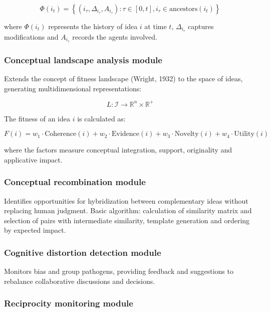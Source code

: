 \begin{equation}
	\Phi(i_t) = \left\{ (i_{\tau}, \Delta_{i_{\tau}}, A_{i_{\tau}}) :
	\tau \in [0,t], i_{\tau} \in \text{ancestors}(i_t) \right\}
\end{equation}


where $\Phi(i_t)$ represents the history of idea $i$ at time $t$, $\Delta_{i_{\tau}}$ captures modifications and $A_{i_{\tau}}$ records the agents involved.

\subsubsection{Conceptual landscape analysis module}

Extends the concept of fitness landscape (Wright, 1932) to the space of ideas, generating multidimensional representations:

\begin{equation}
	L: \mathcal{I} \rightarrow \mathbb{R}^n \times \mathbb{R}^+
\end{equation}

The fitness of an idea $i$ is calculated as:

\begin{equation}
	F(i) = w_1 \cdot \text{Coherence}(i) + w_2 \cdot \text{Evidence}(i) + w_3 \cdot \text{Novelty}(i) + w_4 \cdot \text{Utility}(i)
\end{equation}

where the factors measure conceptual integration, support, originality and applicative impact.

\subsubsection{Conceptual recombination module}

Identifies opportunities for hybridization between complementary ideas without replacing human judgment. Basic algorithm: calculation of similarity matrix and selection of pairs with intermediate similarity, template generation and ordering by expected impact.

\subsubsection{Cognitive distortion detection module}

Monitors bias and group pathogens, providing feedback and suggestions to rebalance collaborative discussions and decisions.

\subsubsection{Reciprocity monitoring module}

